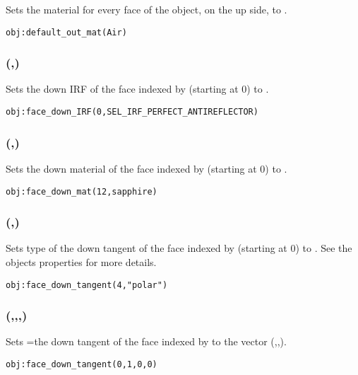 Sets the material for every face of the object, on the up side, to .
\begin{lstlisting}
obj:default_out_mat(Air)
\end{lstlisting}

\subsubsection[face\_down\_IRF]{(,)}

Sets the down IRF of the face indexed by  (starting at 0) to .
\begin{lstlisting}
obj:face_down_IRF(0,SEL_IRF_PERFECT_ANTIREFLECTOR)
\end{lstlisting}

\subsubsection[face\_down\_mat]{(,)}

Sets the down material of the face indexed by  (starting at 0) to .
\begin{lstlisting}
obj:face_down_mat(12,sapphire)
\end{lstlisting}

\subsubsection[face\_down\_tangent (two arguments)]{(,)}

Sets type of the down tangent of the face indexed by  (starting at 0) to . See the objects properties for more details.
\begin{lstlisting}
obj:face_down_tangent(4,"polar")
\end{lstlisting}

\subsubsection[face\_down\_tangent (four arguments)]{(,,,)}

Sets =the down tangent of the face indexed by  to the vector (,,).
\begin{lstlisting}
obj:face_down_tangent(0,1,0,0)
\end{lstlisting}

